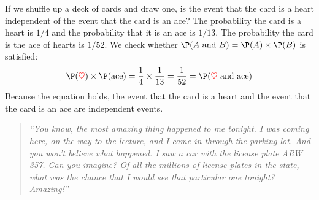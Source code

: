 \documentclass{ccg-topic}
\begin{document}
\begin{ex}{If we shuffle up a deck of cards and draw one, is the event that the card is a heart independent of the event that the card is an ace?}
The probability the card is a heart is $1/4$ and the probability that it is an ace is $1/13$. The probability the card is the ace of hearts is $1/52$.
We check whether $\P(A \text{ and }B) = \P(A) \times  \P(B)$
is satisfied:
\begin{align*}
\P({\color{red}\heartsuit})\times \P(\text{ace}) = \frac{1}{4}\times \frac{1}{13} = \frac{1}{52} 
					= \P({\color{red}\heartsuit}\text{ and ace})
\end{align*}
Because the equation holds, the event that the card is a heart and the event that the card is an ace are independent events.
\end{ex}
\begin{quote}
\textit{%
    ``You know, the most amazing thing happened to me tonight. I was coming here, on the way to the lecture, and I came in through the parking lot. And you won't believe what happened. I saw a car with the license plate ARW 357. Can you imagine? Of all the millions of license plates in the state, what was the chance that I would see that particular one tonight? Amazing!''
}
\end{quote}
\end{document}
